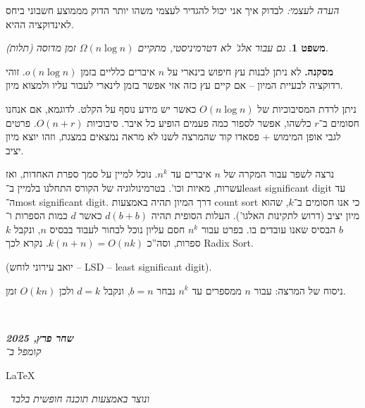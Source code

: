 \documentclass[]{article}
\newcommand\en[1] {\begin{otherlanguage}{english}#1\end{otherlanguage}}
\newcommand\ndoc  {\dotfill \\ \vfil {\begin{center}
            {\textbf{\textit{שחר פרץ, 2025}} \\
                \scriptsize \textit{קומפל ב־}\en{\LaTeX}\,\textit{ ונוצר באמצעות תוכנה חופשית בלבד}}
    \end{center}} \vfil	}
\newcommand\logn  {\log n}
\newtheorem{Theorem}{משפט}
\theoremstyle{definition}
\newcommand\theo  [1] {\begin{Theorem}#1\end{Theorem}}
\begin{document}
    \textit{הערה לעצמי: }לבדוק איך אני יכול להגדיר לעצמי משהו יותר הדוק מממוצע חשבוני ביחס לאינדוקציה ההיא. 
    
    \theo{גם עבור אלג' לא דטרמיניסטי, מתקיים $\Omega(n \logn)$ זמן מדוסה (תלות). }
    
    
    \textbf{מסקנה. }לא ניתן לבנות עץ חיפוש בינארי על $n$ איברים כלליים בזמן $o(n\logn)$. זוהי רדוקציה לבעיית המיון – אם קיים עץ כזה אזי אפשר בזמן לינארי לעבור עליו ולמצוא מיון. 
    
    ניתן לרדת המסיבוכיות של $O(n \logn)$ כאשר יש מידע נוסף על הקלט. לדוגמא, אם אנחנו חסומים ב־$r$ כלשהו, אפשר לספור כמה פעמים הופיע כל איבר. סיבוכיות $O(n + r)$. פרטים לגבי אופן המימוש + פסאדו קוד שהמרצה לשנו לא מראה נמצאים במצגת, וזהו יוצא מיון יציב. 
    
    נרצה לשפר עבור המקרה של $n$ איברים עד $n^k$. נוכל למיין על סמך ספרת האחדות, ואז עשרות, מאיות וכו'. בטרמינולוגיה של הקורס התחלנו בלמיין ב־least significant digit עד ה־most significant digit. דרך המיון תהיה באמצעות count sort כי אנו חסומים ב־$k$, שהוא מיון יציב (דרוש לתקינות האלגו'). העלות הסופית תהיה $d(b + b)$ כאשר $d$ כמות הספרות ו־$b$ הבסיס שאנו עובדים בו. בפרט עבור $n^k$ חסם עליון נוכל לבחור לעבוד בבסיס $n$, ונקבל $k$ ספרות, וסה''כ $k(n + n) = O(nk)$. נקרא לכך Radix Sort. 
    
    (יואב עירוני לוחש – LSD – least significant digit). 
    
    ניסוח של המרצה: 
    עבור $n$ ממספרים עד $n^k$ נבחר $b = n$, ונקבל $d = k$ ולכן $O(kn)$ זמן. 
    
    \ndoc
\end{document}
